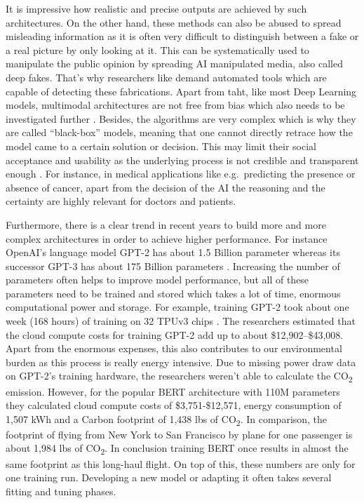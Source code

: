 \documentclass[
]{krantz}
\begin{document}
It is impressive how realistic and precise outputs are achieved by such architectures. On the other hand, these methods can also be abused to spread misleading information as it is often very difficult to distinguish between a fake or a real picture by only looking at it. This can be systematically used to manipulate the public opinion by spreading AI manipulated media, also called deep fakes. That's why researchers like \citet{explainaility} demand automated tools which are capable of detecting these fabrications. Apart from taht, like most Deep Learning models, multimodal architectures are not free from bias which also needs to be investigated further \citep{bias}. Besides, the algorithms are very complex which is why they are called ``black-box'' models, meaning that one cannot directly retrace how the model came to a certain solution or decision. This may limit their social acceptance and usability as the underlying process is not credible and transparent enough \citep{explainaility}. For instance, in medical applications like e.g.~predicting the presence or absence of cancer, apart from the decision of the AI the reasoning and the certainty are highly relevant for doctors and patients.

Furthermore, there is a clear trend in recent years to build more and more complex architectures in order to achieve higher performance. For instance OpenAI's language model GPT-2 has about 1.5 Billion parameter \citep{Radford2019LanguageMA} whereas its successor GPT-3 has about 175 Billion parameters \citep{GPT3}. Increasing the number of parameters often helps to improve model performance, but all of these parameters need to be trained and stored which takes a lot of time, enormous computational power and storage. For example, training GPT-2 took about one week (168 hours) of training on 32 TPUv3 chips \citep{environment}. The researchers \citet{environment} estimated that the cloud compute costs for training GPT-2 add up to about \$12,902--\$43,008. Apart from the enormous expenses, this also contributes to our environmental burden as this process is really energy intensive. Due to missing power draw data on GPT-2's training hardware, the researchers weren't able to calculate the CO\textsubscript{2} emission. However, for the popular BERT architecture with 110M parameters they calculated cloud compute costs of \$3,751-\$12,571, energy consumption of 1,507 kWh and a Carbon footprint of 1,438 lbs of CO\textsubscript{2}. In comparison, the footprint of flying from New York to San Francisco by plane for one passenger is about 1,984 lbs of CO\textsubscript{2}. In conclusion training BERT once results in almost the same footprint as this long-haul flight. On top of this, these numbers are only for one training run. Developing a new model or adapting it often takes several fitting and tuning phases.
\end{document}
